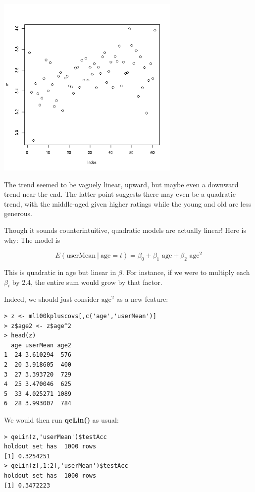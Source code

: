 \includegraphics[width=3.5in]{Images/MeanRatVsAge.png}

The trend seemed to be vaguely linear, upward, but maybe even a downward
trend near the end.  The latter point suggests there may even be a
quadratic trend, with the middle-aged given higher ratings while the
young and old are less generous.

Though it sounds counterintuitive, quadratic models are actually linear!
Here is why:  The model is

\begin{equation}
\label{firstquad}
E( \textrm{userMean} ~|~ \textrm{age} = t) =
\beta_0 + \beta_1 \textrm{ age} + \beta_2 \textrm{ age}^2
\end{equation}

This is quadratic in age but linear in $\beta$.  For instance, if we
were to multiply each $\beta_i$ by 2.4, the entire sum would grow by
that factor.

Indeed, we should just consider $\textrm{age}^2$ as a new feature:

\begin{lstlisting}
> z <- ml100kpluscovs[,c('age','userMean')] 
> z$age2 <- z$age^2
> head(z)
  age userMean age2
1  24 3.610294  576
2  20 3.918605  400
3  27 3.393720  729
4  25 3.470046  625
5  33 4.025271 1089
6  28 3.993007  784
\end{lstlisting}

We would then run \textbf{qeLin()} as usual:

\begin{lstlisting}
> qeLin(z,'userMean')$testAcc
holdout set has  1000 rows
[1] 0.3254251
> qeLin(z[,1:2],'userMean')$testAcc
holdout set has  1000 rows
[1] 0.3472223
\end{lstlisting}

